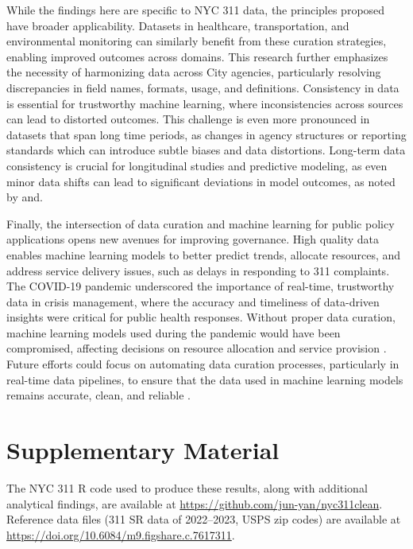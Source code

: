\documentclass[linenumber]{jdsart}
\begin{document}
While the findings here are specific to NYC 311 data, the principles 
proposed have broader applicability. Datasets in healthcare, 
transportation, and environmental monitoring can similarly benefit 
from these curation strategies, enabling improved outcomes across 
domains.
This research further emphasizes the necessity of harmonizing data
across City agencies, particularly resolving discrepancies in field
names, formats, usage, and definitions. Consistency in data is essential for
trustworthy machine learning, where inconsistencies across sources can
lead to distorted outcomes. This challenge is even more pronounced in
datasets that span long time periods, as changes in agency structures
or reporting standards which can introduce subtle biases and data 
distortions. Long-term data consistency is crucial for 
longitudinal studies and predictive modeling, as even minor 
data shifts can lead to significant deviations in model outcomes, 
as noted by \citet{rahm2000data} and\citet{borgman2012conundrum}.


Finally, the intersection of data curation and machine learning for
public policy applications opens new avenues for improving governance.
High quality data enables machine learning models to better predict
trends, allocate resources, and address service delivery issues, such
as delays in responding to 311 complaints. The COVID-19 pandemic
underscored the importance of real-time, trustworthy data in crisis
management, where the accuracy and timeliness of data-driven insights
were critical for public health responses. Without proper data
curation, machine learning models used during the pandemic would have
been compromised, affecting decisions on resource allocation and
service provision \citep{worby2020face, khemasuwan2021applications}.
Future efforts could focus on automating data curation processes,
particularly in real-time data pipelines, to ensure that the data used
in machine learning models remains accurate, clean, and reliable
\citep{chu2016data, hurbean2021open}.


\section*{Supplementary Material}
The NYC 311 R code used to produce these results, along 
with additional analytical findings, are available 
at \url{https://github.com/jun-yan/nyc311clean}. Reference 
data files (311 SR data of 2022--2023, USPS zip codes) are available 
at \url{https://doi.org/10.6084/m9.figshare.c.7617311}.




\end{document}
